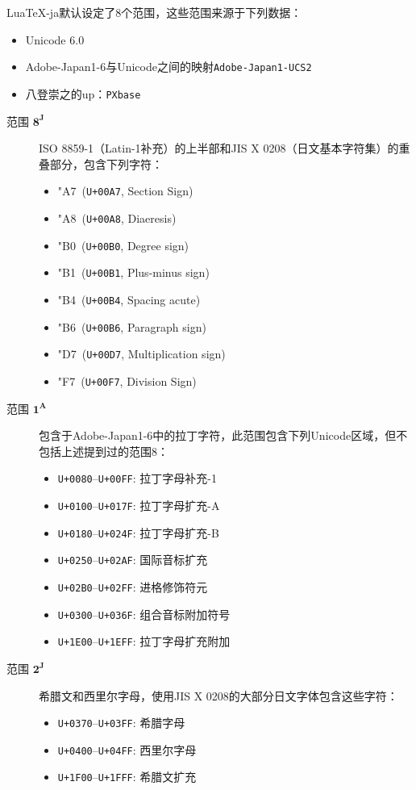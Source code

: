 \documentclass{ltjarticle}
\DeclareRobustCommand\LuaTeX{Lua\TeX}
\begin{document}
\LuaTeX-ja默认设定了8个范围，这些范围来源于下列数据：
\begin{itemize}
\item Unicode 6.0
\item Adobe-Japan1-6与Unicode之间的映射\verb!Adobe-Japan1-UCS2!
\item 八登崇之的up：\verb!PXbase!
\end{itemize}

\begin{description}
\item[范围 $\mathbf{8^J}$] ISO 8859-1（Latin-1补充）的上半部和JIS X 0208（日文基本字符集）的重叠部分，包含下列字符：
\begin{multicols}{2}
	\begin{itemize}
	\def\ch#1#2{\item \char"#1\ (\texttt{U+00#1}, #2)}
	\ch{A7}{Section Sign}
	\ch{A8}{Diaeresis}
	\ch{B0}{Degree sign}
	\ch{B1}{Plus-minus sign}
	\ch{B4}{Spacing acute}
	\ch{B6}{Paragraph sign}
	\ch{D7}{Multiplication sign}
	\ch{F7}{Division Sign}
	\end{itemize}
\end{multicols}

\item[范围 $\mathbf{1^A}$] 包含于Adobe-Japan1-6中的拉丁字符，此范围包含下列Unicode区域，但不包括上述提到过的范围8：
\begin{multicols}{2}
	\begin{itemize}
	\item \texttt{U+0080}--\texttt{U+00FF}: 拉丁字母补充-1
	\item \texttt{U+0100}--\texttt{U+017F}: 拉丁字母扩充-A
	\item \texttt{U+0180}--\texttt{U+024F}: 拉丁字母扩充-B
	\item \texttt{U+0250}--\texttt{U+02AF}: 国际音标扩充
	\item \texttt{U+02B0}--\texttt{U+02FF}: 进格修饰符元
	\item \texttt{U+0300}--\texttt{U+036F}: 组合音标附加符号
	\item \texttt{U+1E00}--\texttt{U+1EFF}: 拉丁字母扩充附加
	\end{itemize}
\end{multicols}

\item[范围 $\mathbf{2^J}$] 希腊文和西里尔字母，使用JIS X 0208的大部分日文字体包含这些字符：
\begin{multicols}{2}
	\begin{itemize}
	\item \texttt{U+0370}--\texttt{U+03FF}: 希腊字母
	\item \texttt{U+0400}--\texttt{U+04FF}: 西里尔字母	
	\item \texttt{U+1F00}--\texttt{U+1FFF}: 希腊文扩充
	\end{itemize}
\end{multicols}


\end{description}
\end{document}
